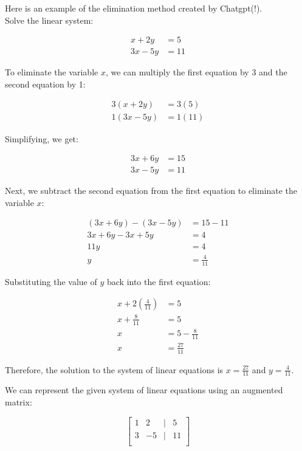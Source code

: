 \documentclass[handout]{ximera}
\begin{document}
Here is an example of the elimination method created by Chatgpt(!).\\

Solve the linear system:

\begin{align*}
x + 2y &= 5 \\
3x - 5y &= 11
\end{align*}

To eliminate the variable $x$, we can multiply the first equation by 3 and the second equation by 1:

\begin{align*}
3(x + 2y) &= 3(5) \\
1(3x - 5y) &= 1(11)
\end{align*}

Simplifying, we get:

\begin{align*}
3x + 6y &= 15 \\
3x - 5y &= 11
\end{align*}

Next, we subtract the second equation from the first equation to eliminate the variable $x$:

\begin{align*}
(3x + 6y) - (3x - 5y) &= 15 - 11 \\
3x + 6y - 3x + 5y &= 4 \\
11y &= 4 \\
y &= \frac{4}{11}
\end{align*}

Substituting the value of $y$ back into the first equation:

\begin{align*}
x + 2\left(\frac{4}{11}\right) &= 5 \\
x + \frac{8}{11} &= 5 \\
x &= 5 - \frac{8}{11} \\
x &= \frac{27}{11}
\end{align*}

Therefore, the solution to the system of linear equations is $x = \frac{27}{11}$ and $y = \frac{4}{11}$.


We can represent the given system of linear equations using an augmented matrix:

\[
\begin{bmatrix}
1 & 2 & \vert & 5 \\
3 & -5 & \vert & 11 \\
\end{bmatrix}
\]
\end{document}
